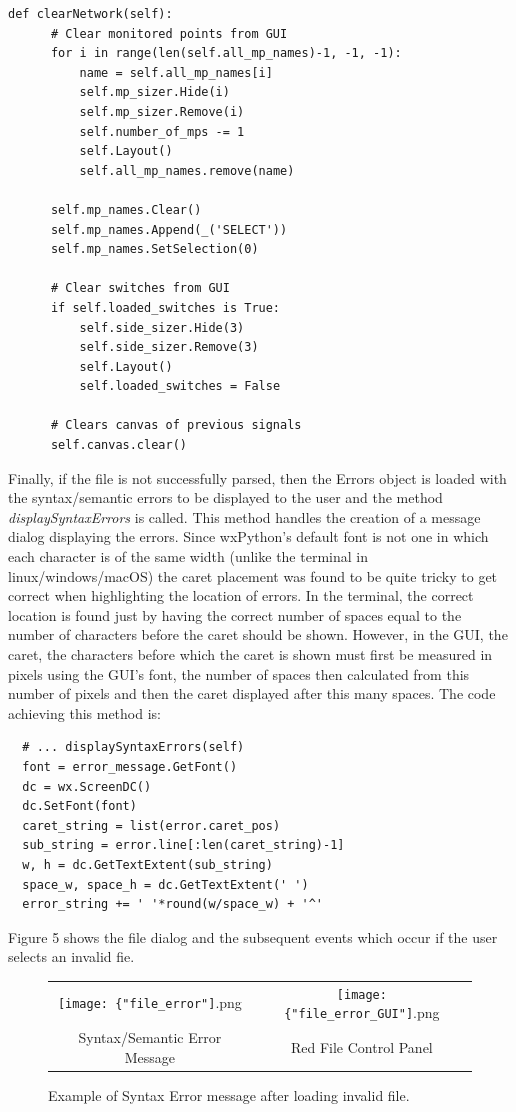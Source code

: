 \documentclass{article}					%
\begin{document}
\begin{verbatim}
def clearNetwork(self):
      # Clear monitored points from GUI
      for i in range(len(self.all_mp_names)-1, -1, -1):
          name = self.all_mp_names[i]
          self.mp_sizer.Hide(i)
          self.mp_sizer.Remove(i)
          self.number_of_mps -= 1
          self.Layout()
          self.all_mp_names.remove(name)

      self.mp_names.Clear()
      self.mp_names.Append(_('SELECT'))
      self.mp_names.SetSelection(0)

      # Clear switches from GUI
      if self.loaded_switches is True:
          self.side_sizer.Hide(3)
          self.side_sizer.Remove(3)
          self.Layout()
          self.loaded_switches = False

      # Clears canvas of previous signals
      self.canvas.clear()
\end{verbatim}

Finally, if the file is not successfully parsed, then the Errors object is loaded with the syntax/semantic errors to be displayed to the user and the method \textit{displaySyntaxErrors} is called. This method handles the creation of a message dialog displaying the errors. Since wxPython's default font is not one in which each character is of the same width (unlike the terminal in linux/windows/macOS) the caret placement was found to be quite tricky to get correct when highlighting the location of errors. In the terminal, the correct location is found just by having the correct number of spaces equal to the number of characters before the caret should be shown. However, in the GUI, the caret, the characters before which the caret is shown must first be measured in pixels using the GUI's font, the number of spaces then calculated from this number of pixels and then the caret displayed after this many spaces. The code achieving this method is:
\begin{verbatim}
  # ... displaySyntaxErrors(self)
  font = error_message.GetFont()
  dc = wx.ScreenDC()
  dc.SetFont(font)
  caret_string = list(error.caret_pos)
  sub_string = error.line[:len(caret_string)-1]
  w, h = dc.GetTextExtent(sub_string)
  space_w, space_h = dc.GetTextExtent(' ')
  error_string += ' '*round(w/space_w) + '^'
\end{verbatim}
Figure 5 shows the file dialog and the subsequent events which occur if the user selects an invalid fie.
\begin{figure}[h!]
\begin{centering}
\begin{tabular}{c c}
  \texttt{[image: \{"file\_error"]}.png} & \texttt{[image: \{"file\_error\_GUI"]}.png}\\
  Syntax/Semantic Error Message & Red File Control Panel\\
\end{tabular}
\caption{Example of Syntax Error message after loading invalid file.}
\end{centering}
\end{figure}
\end{document}
